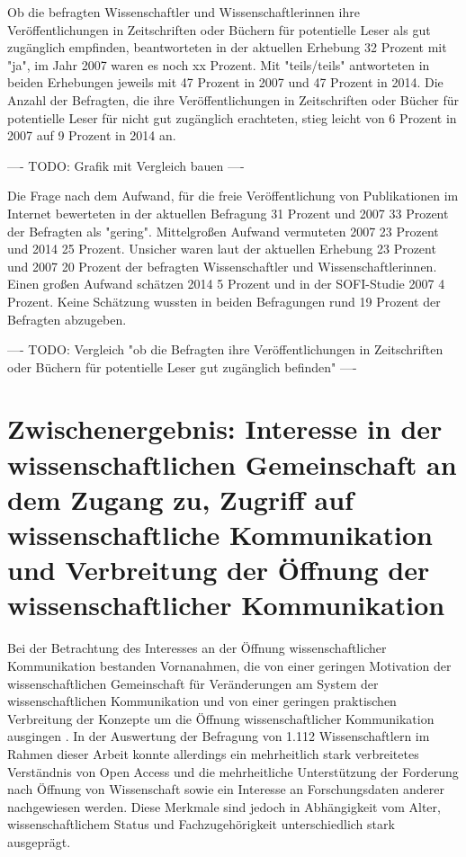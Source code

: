 Ob die befragten Wissenschaftler und Wissenschaftlerinnen ihre Veröffentlichungen in Zeitschriften oder Büchern für potentielle Leser als gut zugänglich empfinden, beantworteten in der aktuellen Erhebung 32 Prozent mit "ja", im Jahr 2007 waren es noch xx Prozent. Mit "teils/teils" antworteten in beiden Erhebungen jeweils mit 47 Prozent in 2007 und 47 Prozent in 2014. Die Anzahl der Befragten, die ihre Veröffentlichungen in Zeitschriften oder Bücher für potentielle Leser für nicht gut zugänglich erachteten, stieg leicht von 6 Prozent in 2007 auf 9 Prozent in 2014 an.

---- TODO: Grafik mit Vergleich bauen ----

Die Frage nach dem Aufwand, für die freie Veröffentlichung von Publikationen im Internet bewerteten in der aktuellen Befragung 31 Prozent und 2007 33 Prozent der Befragten als "gering". Mittelgroßen Aufwand vermuteten 2007 23 Prozent und 2014 25 Prozent. Unsicher waren laut der aktuellen Erhebung 23 Prozent und 2007 20 Prozent der befragten Wissenschaftler und Wissenschaftlerinnen. Einen großen Aufwand schätzen 2014 5 Prozent und in der SOFI-Studie 2007 4 Prozent. Keine Schätzung wussten in beiden Befragungen rund 19 Prozent der Befragten abzugeben.

---- TODO: Vergleich "ob die Befragten ihre Veröffentlichungen in Zeitschriften oder Büchern für potentielle Leser gut zugänglich befinden" ----

\section{Zwischenergebnis: Interesse in der wissenschaftlichen Gemeinschaft an dem Zugang zu, Zugriff auf wissenschaftliche Kommunikation und Verbreitung der Öffnung der wissenschaftlicher Kommunikation}

Bei der Betrachtung des Interesses an der Öffnung wissenschaftlicher Kommunikation bestanden Vornanahmen, die von einer geringen Motivation der wissenschaftlichen Gemeinschaft für Veränderungen am System der wissenschaftlichen Kommunikation \cite{hagner_2015_sache_buches} und von einer geringen praktischen Verbreitung der Konzepte um die Öffnung wissenschaftlicher Kommunikation ausgingen \cite{Scheliga_2014}. In der Auswertung der Befragung von 1.112 Wissenschaftlern im Rahmen dieser Arbeit konnte allerdings ein mehrheitlich stark verbreitetes Verständnis von Open Access und die mehrheitliche Unterstützung der Forderung nach Öffnung von Wissenschaft sowie ein Interesse an Forschungsdaten anderer nachgewiesen werden. Diese Merkmale sind jedoch in Abhängigkeit vom Alter, wissenschaftlichem Status und Fachzugehörigkeit unterschiedlich stark ausgeprägt.

